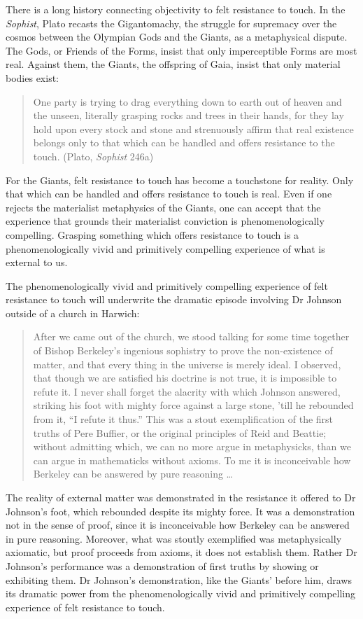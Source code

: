 \documentclass[12pt]{article}
\begin{document}
There is a long history connecting objectivity to felt resistance to touch. In the \emph{Sophist}, Plato recasts the Gigantomachy, the struggle for supremacy over the cosmos between the Olympian Gods and the Giants, as a metaphysical dispute. The Gods, or Friends of the Forms, insist that only imperceptible Forms are most real. Against them, the Giants, the offspring of Gaia, insist that only material bodies exist:
\begin{quote}
	One party is trying to drag everything down to earth out of heaven and the unseen, literally grasping rocks and trees in their hands, for they lay hold upon every stock and stone and strenuously affirm that real existence belongs only to that which can be handled and offers resistance to the touch. (Plato, \emph{Sophist} 246a)
\end{quote}
For the Giants, felt resistance to touch has become a touchstone for reality. Only that which can be handled and offers resistance to touch is real. Even if one rejects the materialist metaphysics of the Giants, one can accept that the experience that grounds their materialist conviction is phenomenologically compelling. Grasping something which offers resistance to touch is a phenomenologically vivid and primitively compelling experience of what is external to us. 

The phenomenologically vivid and primitively compelling experience of felt resistance to touch will underwrite the dramatic episode involving Dr Johnson outside of a church in Harwich:
\begin{quote}
	After we came out of the church, we stood talking for some time together of Bishop Berkeley’s ingenious sophistry to prove the non-existence of matter, and that every thing in the universe is merely ideal. I observed, that though we are satisfied his doctrine is not true, it is impossible to refute it. I never shall forget the alacrity with which Johnson answered, striking his foot with mighty force against a large stone, ’till he rebounded from it, ``I refute it thus.'' This was a stout exemplification of the first truths of Pere Buffier, or the original principles of Reid and Beattie; without admitting which, we can no more argue in metaphysicks, than we can argue in mathematicks without axioms. To me it is inconceivable how Berkeley can be answered by pure reasoning \ldots\ 
\end{quote}
The reality of external matter was demonstrated in the resistance it offered to Dr Johnson’s foot, which rebounded despite its mighty force. It was a demonstration not in the sense of proof, since it is inconceivable how Berkeley can be answered in pure reasoning. Moreover, what was stoutly exemplified was metaphysically axiomatic, but proof proceeds from axioms, it does not establish them. Rather Dr Johnson’s performance was a demonstration of first truths by showing or exhibiting them. Dr Johnson's demonstration, like the Giants' before him, draws its dramatic power from the phenomenologically vivid and primitively compelling experience of felt resistance to touch.
\end{document}
